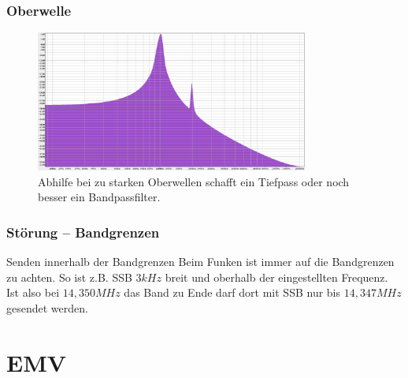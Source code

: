 \begin{frame}
  \frametitle{Oberwelle}
  \begin{center}
    \begin{figure}
      \includegraphics[width=0.8\textwidth,height=.75\textheight,keepaspectratio]{a19/oberwelle.png}
      \caption{Abhilfe bei zu starken Oberwellen schafft ein Tiefpass oder noch besser ein Bandpassfilter.}
    \end{figure}
  \end{center}
\end{frame}

\begin{frame}
  \frametitle{Störung -- Bandgrenzen}
  \begin{center}
    \begin{block}{Senden innerhalb der Bandgrenzen}
      Beim Funken ist immer auf die Bandgrenzen zu achten. So ist z.B. SSB $3kHz$ breit und oberhalb der eingestellten Frequenz. Ist also bei $14,350MHz$ das Band zu Ende darf dort mit SSB nur bis $14,347MHz$ gesendet werden.
    \end{block}
  \end{center}
\end{frame}

\section*{EMV}


